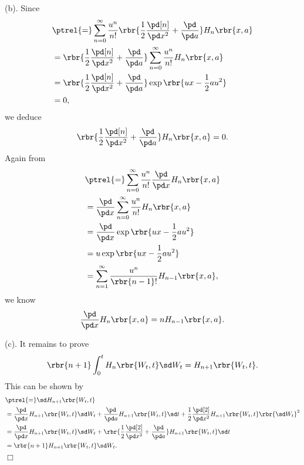 \documentclass[english, nochinese]{pnote}
\begin{document}
(b). Since
\begin{equation}
\begin{split}
&\ptrel{=} \sum_{ n = 0 }^{\infty} \frac{u^n}{ n ! } \rbr{ \frac{1}{2} \frac{\pd[n]}{ \pd x^2 } + \frac{\pd}{ \pd a } } H_n \rbr{ x, a } \\
&= \rbr{ \frac{1}{2} \frac{\pd[n]}{ \pd x^2 } + \frac{\pd}{ \pd a } } \sum_{ n = 0 }^{\infty} \frac{u^n}{ n ! } H_n \rbr{ x, a } \\
&= \rbr{ \frac{1}{2} \frac{\pd[n]}{ \pd x^2 } + \frac{\pd}{ \pd a } } \exp \rbr{ u x - \frac{1}{2} a u^2 } \\
&= 0,
\end{split}
\end{equation}
we deduce
\begin{equation}
\rbr{ \frac{1}{2} \frac{\pd[n]}{ \pd x^2 } + \frac{\pd}{ \pd a } } H_n \rbr{ x, a } = 0.
\end{equation}
Again from
\begin{equation}
\begin{split}
&\ptrel{=} \sum_{ n = 0 }^{\infty} \frac{u^n}{ n ! } \frac{\pd}{ \pd x } H_n \rbr{ x, a } \\
&= \frac{\pd}{ \pd x } \sum_{ n = 0 }^{\infty} \frac{u^n}{ n ! } H_n \rbr{ x, a } \\
&= \frac{\pd}{ \pd x } \exp \rbr{ u x - \frac{1}{2} a u^2 } \\
&= u \exp \rbr{ u x - \frac{1}{2} a u^2 } \\
&= \sum_{ n = 1 }^{\infty} \frac{u^n}{ \rbr{ n - 1 } ! } H_{ n - 1 } \rbr{ x, a },
\end{split}
\end{equation}
we know
\begin{equation}
\frac{\pd}{ \pd x } H_n \rbr{ x, a } = n H_{ n - 1 } \rbr{ x, a }.
\end{equation}

(c). It remains to prove
\begin{equation}
\rbr{ n + 1 } \int_0^t H_n \rbr{ W_t, t } \sd W_t = H_{ n + 1 } \rbr{ W_t, t }.
\end{equation}
This can be shown by
\begin{equation}
\begin{split}
&\ptrel{=} \sd H_{ n + 1 } \rbr{ W_t, t } \\
&= \frac{\pd}{ \pd x } H_{ n + 1 } \rbr{ W_t, t } \sd W_t + \frac{\pd}{ \pd a } H_{ n + 1 } \rbr{ W_t, t } \sd t + \frac{1}{2} \frac{\pd[2]}{ \pd x^2 } H_{ n + 1 } \rbr{ W_t, t } \rbr{ \sd W_t }^2 \\
&= \frac{\pd}{ \pd x } H_{ n + 1 } \rbr{ W_t, t } \sd W_t + \rbr{ \frac{1}{2} \frac{\pd[2]}{ \pd x^2 } + \frac{\pd}{ \pd a } } H_{ n + 1 } \rbr{ W_t, t } \sd t \\
&= \rbr{ n + 1 } H_{ n + 1 } \rbr{ W_t, t } \sd W_t.
\end{split}
\end{equation}
\hfill$\Box$
\end{document}
